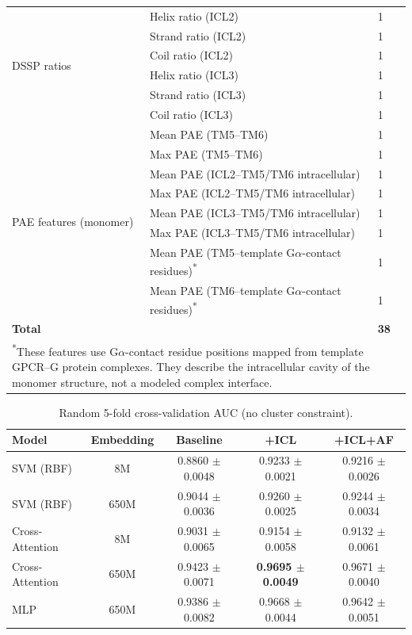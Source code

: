 \documentclass[11pt,a4paper]{article}
\begin{document}
\begin{table}[h!]
\begin{tabular}{lll}
\midrule
\multirow{6}{*}{DSSP ratios} & Helix ratio (ICL2) & 1 \\
                             & Strand ratio (ICL2) & 1 \\
                             & Coil ratio (ICL2) & 1 \\
                             & Helix ratio (ICL3) & 1 \\
                             & Strand ratio (ICL3) & 1 \\
                             & Coil ratio (ICL3) & 1 \\
\midrule
\multirow{8}{*}{PAE features (monomer)} & Mean PAE (TM5--TM6) & 1 \\
                              & Max PAE (TM5--TM6) & 1 \\
                              & Mean PAE (ICL2--TM5/TM6 intracellular) & 1 \\
                              & Max PAE (ICL2--TM5/TM6 intracellular) & 1 \\
                              & Mean PAE (ICL3--TM5/TM6 intracellular) & 1 \\
                              & Max PAE (ICL3--TM5/TM6 intracellular) & 1 \\
                              & Mean PAE (TM5--template G$\alpha$-contact residues)\textsuperscript{*} & 1 \\
                              & Mean PAE (TM6--template G$\alpha$-contact residues)\textsuperscript{*} & 1 \\
\midrule
\multicolumn{2}{l}{\textbf{Total}} & \textbf{38} \\
\bottomrule
\multicolumn{3}{p{0.88\textwidth}}{\small \textsuperscript{*}These features use G$\alpha$-contact residue positions mapped from template GPCR--G protein complexes. They describe the intracellular cavity of the monomer structure, not a modeled complex interface.} \\
\end{tabular}
\end{table}

\begin{table}[h!]
\centering
\caption{Random 5-fold cross-validation AUC (no cluster constraint).}
\label{tab:random_cv}
\begin{tabular}{lcccc}
\toprule
Model & Embedding & Baseline & +ICL & +ICL+AF \\
\midrule
SVM (RBF)       & 8M   & 0.8860 $\pm$ 0.0048 & 0.9233 $\pm$ 0.0021 & 0.9216 $\pm$ 0.0026 \\
SVM (RBF)       & 650M & 0.9044 $\pm$ 0.0036 & 0.9260 $\pm$ 0.0025 & 0.9244 $\pm$ 0.0034 \\
Cross-Attention & 8M   & 0.9031 $\pm$ 0.0065 & 0.9154 $\pm$ 0.0058 & 0.9132 $\pm$ 0.0061 \\
Cross-Attention & 650M & 0.9423 $\pm$ 0.0071 & \textbf{0.9695 $\pm$ 0.0049} & 0.9671 $\pm$ 0.0040 \\
MLP             & 650M & 0.9386 $\pm$ 0.0082 & 0.9668 $\pm$ 0.0044 & 0.9642 $\pm$ 0.0051 \\
\bottomrule
\end{tabular}
\end{table}
\end{document}
